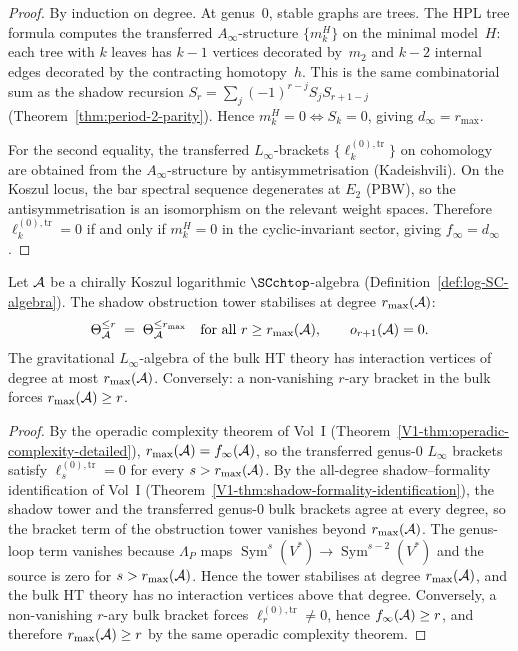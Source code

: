 \begin{proof}
By induction on degree. At genus~$0$, stable graphs are trees.
The HPL tree formula computes the transferred $A_\infty$-structure
$\{m_k^H\}$ on the minimal model~$H$: each tree with $k$ leaves has
$k-1$ vertices decorated by~$m_2$ and $k-2$ internal edges
decorated by the contracting homotopy~$h$. This is the same
combinatorial sum as the shadow recursion
$S_r = \sum_{j} (-1)^{r-j} S_j S_{r+1-j}$
(Theorem~\ref{thm:period-2-parity}). Hence
$m_k^H = 0 \Leftrightarrow S_k = 0$, giving
$d_\infty = r_{\max}$.

For the second equality, the transferred $L_\infty$-brackets
$\{\ell_k^{(0),\mathrm{tr}}\}$ on cohomology are obtained from
the $A_\infty$-structure by antisymmetrisation (Kadeishvili).
On the Koszul locus, the bar spectral sequence degenerates at
$E_2$ (PBW), so the antisymmetrisation is an isomorphism on the
relevant weight spaces. Therefore $\ell_k^{(0),\mathrm{tr}} = 0$
if and only if $m_k^H = 0$ in the cyclic-invariant sector, giving
$f_\infty = d_\infty$.
\end{proof}

\begin{theorem}
\ClaimStatusProvedHere
{}
Let $\mathcal{A}$ be a chirally Koszul logarithmic $\SCchtop$-algebra
\textup{(}Definition~\textup{\ref{def:log-SC-algebra}}\textup{)}.
The shadow obstruction tower stabilises at degree $r_{\max}(\mathcal{A})$:
\begin{equation}%
\Theta_\cA^{\leq r}
\;=\;
\Theta_\cA^{\leq r_{\max}}
\quad \text{for all } r \geq r_{\max}(\cA),
\qquad
o_{r+1}(\cA) = 0.
\end{equation}
The gravitational $L_\infty$-algebra of the bulk HT theory
has interaction vertices of degree at most $r_{\max}(\mathcal{A})$.
Conversely: a non-vanishing $r$-ary bracket in the bulk
forces $r_{\max}(\mathcal{A}) \geq r$.
\end{theorem}

\begin{proof}
By the operadic complexity theorem of Vol~I
\textup{(}Theorem~\textup{\ref*{V1-thm:operadic-complexity-detailed}}\textup{)},
$r_{\max}(\mathcal{A}) = f_\infty(\mathcal{A})$, so the transferred genus-$0$
$L_\infty$ brackets satisfy
$\ell_s^{(0),\mathrm{tr}} = 0$ for every $s > r_{\max}(\mathcal{A})$.
By the all-degree shadow--formality identification of Vol~I
\textup{(}Theorem~\textup{\ref*{V1-thm:shadow-formality-identification}}\textup{)},
the shadow tower and the transferred genus-$0$ bulk brackets agree at
every degree, so the bracket term of the obstruction tower vanishes
beyond $r_{\max}(\mathcal{A})$. The genus-loop term vanishes because
$\Lambda_P$ maps $\operatorname{Sym}^s(V^*) \to
\operatorname{Sym}^{s-2}(V^*)$ and the source is zero for
$s > r_{\max}(\mathcal{A})$. Hence the tower stabilises at degree
$r_{\max}(\mathcal{A})$, and the bulk HT theory has no interaction vertices
above that degree. Conversely, a non-vanishing $r$-ary bulk bracket
forces $\ell_r^{(0),\mathrm{tr}} \neq 0$, hence
$f_\infty(\mathcal{A}) \ge r$, and therefore
$r_{\max}(\mathcal{A}) \ge r$ by the same operadic complexity theorem.
\end{proof}

